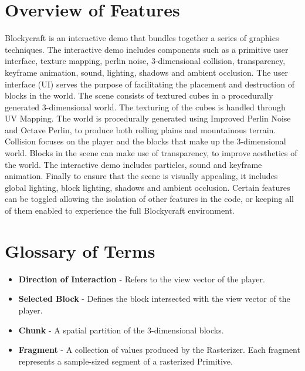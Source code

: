 \documentclass{book}
\newcommand{\Blockycraft}{Blockycraft}
\begin{document}
\section{Overview of Features}
\Blockycraft{} is an interactive demo that bundles together a series of graphics techniques.  The interactive demo includes components such as a primitive user interface, texture mapping, perlin noise, 3-dimensional collision, transparency, keyframe animation, sound, lighting, shadows and ambient occlusion.  The user interface (UI) serves the purpose of facilitating the placement and destruction of blocks in the world.  The scene consists of textured cubes in a procedurally generated 3-dimensional world.  The texturing of the cubes is handled through UV Mapping.  The world is procedurally generated using Improved Perlin Noise and Octave Perlin, to produce both rolling plains and mountainous terrain.  Collision focuses on the player and the blocks that make up the 3-dimensional world.  Blocks in the scene can make use of transparency, to improve aesthetics of the world.  The interactive demo includes particles, sound and keyframe animation.  Finally to ensure that the scene is visually appealing, it includes global lighting, block lighting, shadows and ambient occlusion.  Certain features can be toggled allowing the isolation of other features in the code, or keeping all of them enabled to experience the full \Blockycraft{} environment.

\section{Glossary of Terms}
\begin{itemize}
\item \textbf{Direction of Interaction} - Refers to the view vector of the player.
\item \textbf{Selected Block} - Defines the block intersected with the view vector of the player.
\item \textbf{Chunk} - A spatial partition of the 3-dimensional blocks.
\item \textbf{Fragment} - A collection of values produced by the Rasterizer. Each fragment represents a sample-sized segment of a rasterized Primitive.
\end{itemize}

\end{document}
